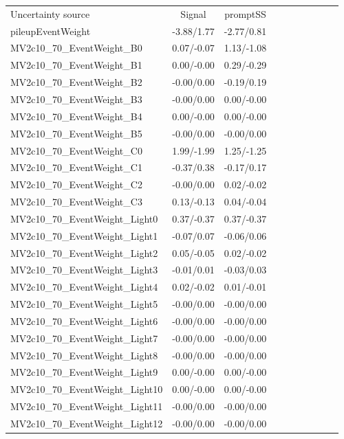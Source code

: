 \begin{table}[h]
\scriptsize
\begin{center}
\begin{tabular}{l|ccccccccc}
\hline
\hline
Uncertainty source &Signal &promptSS \\
pileupEventWeight &-3.88/1.77 &-2.77/0.81 \\
MV2c10\_70\_EventWeight\_B0 &0.07/-0.07 &1.13/-1.08 \\
MV2c10\_70\_EventWeight\_B1 &0.00/-0.00 &0.29/-0.29 \\
MV2c10\_70\_EventWeight\_B2 &-0.00/0.00 &-0.19/0.19 \\
MV2c10\_70\_EventWeight\_B3 &-0.00/0.00 &0.00/-0.00 \\
MV2c10\_70\_EventWeight\_B4 &0.00/-0.00 &0.00/-0.00 \\
MV2c10\_70\_EventWeight\_B5 &-0.00/0.00 &-0.00/0.00 \\
MV2c10\_70\_EventWeight\_C0 &1.99/-1.99 &1.25/-1.25 \\
MV2c10\_70\_EventWeight\_C1 &-0.37/0.38 &-0.17/0.17 \\
MV2c10\_70\_EventWeight\_C2 &-0.00/0.00 &0.02/-0.02 \\
MV2c10\_70\_EventWeight\_C3 &0.13/-0.13 &0.04/-0.04 \\
MV2c10\_70\_EventWeight\_Light0 &0.37/-0.37 &0.37/-0.37 \\
MV2c10\_70\_EventWeight\_Light1 &-0.07/0.07 &-0.06/0.06 \\
MV2c10\_70\_EventWeight\_Light2 &0.05/-0.05 &0.02/-0.02 \\
MV2c10\_70\_EventWeight\_Light3 &-0.01/0.01 &-0.03/0.03 \\
MV2c10\_70\_EventWeight\_Light4 &0.02/-0.02 &0.01/-0.01 \\
MV2c10\_70\_EventWeight\_Light5 &-0.00/0.00 &-0.00/0.00 \\
MV2c10\_70\_EventWeight\_Light6 &-0.00/0.00 &-0.00/0.00 \\
MV2c10\_70\_EventWeight\_Light7 &-0.00/0.00 &-0.00/0.00 \\
MV2c10\_70\_EventWeight\_Light8 &-0.00/0.00 &-0.00/0.00 \\
MV2c10\_70\_EventWeight\_Light9 &0.00/-0.00 &0.00/-0.00 \\
MV2c10\_70\_EventWeight\_Light10 &0.00/-0.00 &0.00/-0.00 \\
MV2c10\_70\_EventWeight\_Light11 &-0.00/0.00 &-0.00/0.00 \\
MV2c10\_70\_EventWeight\_Light12 &-0.00/0.00 &-0.00/0.00 \\

\end{tabular}
\end{center}
\end{table}
